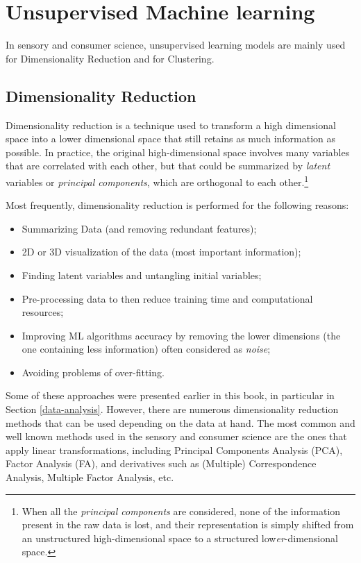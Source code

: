 \documentclass[
]{krantz}
\providecommand{\tightlist}{%
  \setlength{\itemsep}{0pt}\setlength{\parskip}{0pt}}
\begin{document}
\hypertarget{unsupervised-machine-learning}{%
\section{Unsupervised Machine learning}\label{unsupervised-machine-learning}}

In sensory and consumer science, unsupervised learning models are mainly used for Dimensionality Reduction and for Clustering.

\hypertarget{dimensionality-reduction}{%
\subsection{Dimensionality Reduction}\label{dimensionality-reduction}}

Dimensionality reduction is a technique used to transform a high dimensional space into a lower dimensional space that still retains as much information as possible. In practice, the original high-dimensional space involves many variables that are correlated with each other, but that could be summarized by \emph{latent} variables or \emph{principal components}, which are orthogonal to each other.\footnote{When all the \emph{principal components} are considered, none of the information present in the raw data is lost, and their representation is simply shifted from an unstructured high-dimensional space to a structured low\emph{er}-dimensional space.}

Most frequently, dimensionality reduction is performed for the following reasons:

\begin{itemize}
\tightlist
\item
  Summarizing Data (and removing redundant features);
\item
  2D or 3D visualization of the data (most important information);
\item
  Finding latent variables and untangling initial variables;
\item
  Pre-processing data to then reduce training time and computational resources;
\item
  Improving ML algorithms accuracy by removing the lower dimensions (the one containing less information) often considered as \emph{noise};
\item
  Avoiding problems of over-fitting.
\end{itemize}

Some of these approaches were presented earlier in this book, in particular in Section \ref{data-analysis}. However, there are numerous dimensionality reduction methods that can be used depending on the data at hand. The most common and well known methods used in the sensory and consumer science are the ones that apply linear transformations, including Principal Components Analysis (PCA), Factor Analysis (FA), and derivatives such as (Multiple) Correspondence Analysis, Multiple Factor Analysis, etc.
\end{document}
